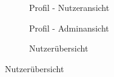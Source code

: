 \documentclass[fontsize=12pt,openright,oneside,paper=a4,BCOR=1cm]{scrbook}
\begin{document}
\begin{figure}[H]
  \centering
  \begin{subfigure}[b]{0.5\linewidth}
    \caption{Profil - Nutzeransicht}
  \end{subfigure}
  \begin{subfigure}[b]{0.5\linewidth}
    \caption{Profil - Adminansicht}
  \end{subfigure}
  \begin{subfigure}[b]{0.5\linewidth}
    \caption{Nutzerübersicht}
  \end{subfigure}
  \caption{Nutzerübersicht}
  \label{fig:anwendung-nutzerubersicht}
\end{figure}
\end{document}

